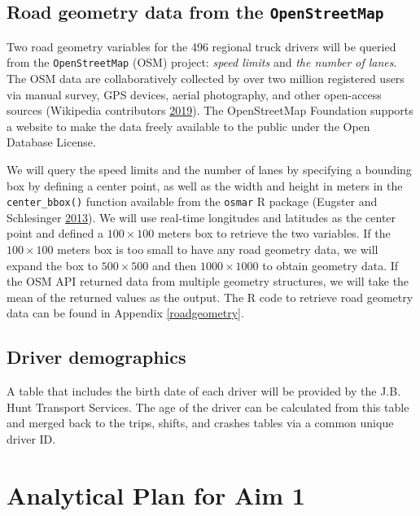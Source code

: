 \documentclass[12pt]{book}
\numberwithin{equation}{chapter}
\begin{document}
\hypertarget{road-geometry-data-from-the-openstreetmap}{%
\subsection{\texorpdfstring{Road geometry data from the \texttt{OpenStreetMap}}{Road geometry data from the OpenStreetMap}}\label{road-geometry-data-from-the-openstreetmap}}

Two road geometry variables for the 496 regional truck drivers will be queried from the \texttt{OpenStreetMap} (OSM) project: \emph{speed limits} and \emph{the number of lanes}.
The OSM data are collaboratively collected by over two million registered users via manual survey, GPS devices, aerial photography, and other open-access sources (Wikipedia contributors \protect\hyperlink{ref-wikiOSM}{2019}).
The OpenStreetMap Foundation supports a website to make the data freely available to the public under the Open Database License.

We will query the speed limits and the number of lanes by specifying a bounding box by defining a center point, as well as the width and height in meters in the \texttt{center\_bbox()} function available from the \texttt{osmar} R package (Eugster and Schlesinger \protect\hyperlink{ref-eugster2013osmar}{2013}).
We will use real-time longitudes and latitudes as the center point and defined a \(100\times100\) meters box to retrieve the two variables.
If the \(100\times100\) meters box is too small to have any road geometry data, we will expand the box to \(500\times500\) and then \(1000\times1000\) to obtain geometry data.
If the OSM API returned data from multiple geometry structures, we will take the mean of the returned values as the output.
The R code to retrieve road geometry data can be found in Appendix \ref{roadgeometry}.

\hypertarget{driver-demographics}{%
\subsection{Driver demographics}\label{driver-demographics}}

A table that includes the birth date of each driver will be provided by the J.B. Hunt Transport Services. The age of the driver can be calculated from this table and merged back to the trips, shifts, and crashes tables via a common unique driver ID.

\hypertarget{analytical-plan-for-aim-1}{%
\section{Analytical Plan for Aim 1}\label{analytical-plan-for-aim-1}}
\end{document}
